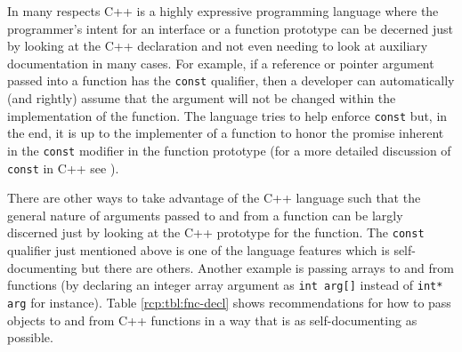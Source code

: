 In many respects C++ is a highly expressive programming language where
the programmer's intent for an interface or a function prototype can
be decerned just by looking at the C++ declaration and not even
needing to look at auxiliary documentation in many cases.  For
example, if a reference or pointer argument passed into a function has
the {}\texttt{const} qualifier, then a developer can automatically
(and rightly) assume that the argument will not be changed within the
implementation of the function.  The language tries to help enforce
{}\texttt{const} but, in the end, it is up to the implementer of a
function to honor the promise inherent in the {}\texttt{const}
modifier in the function prototype (for a more detailed discussion of
{}\texttt{const} in C++ see {}\cite[Section
10.2.7.1]{ref:stroustrup_2000}).

There are other ways to take advantage of the C++ language such that
the general nature of arguments passed to and from a function can be
largly discerned just by looking at the C++ prototype for the
function.  The {}\texttt{const} qualifier just mentioned above is one
of the language features which is self-documenting but there are
others.  Another example is passing arrays to and from functions (by
declaring an integer array argument as {}\texttt{int arg[]} instead of
{}\texttt{int* arg} for instance).  Table {}\ref{rcp:tbl:fnc-decl}
shows recommendations for how to pass objects to and from C++
functions in a way that is as self-documenting as possible.

